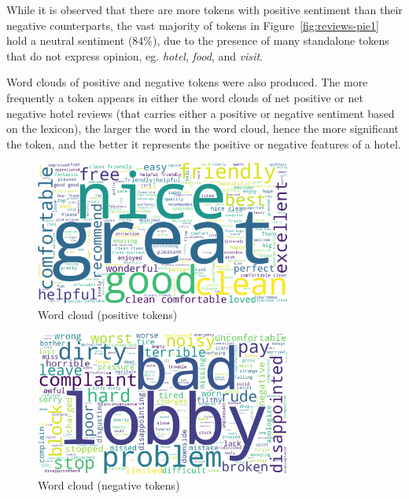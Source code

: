 \documentclass[12pt, bibliography=totocnumbered, paper=a4]{scrartcl}
\def\it#1{\textit{#1}}
\begin{document}
While it is observed that there are more tokens with positive sentiment than
their negative counterparts, the vast majority of tokens in
Figure~\ref{fig:reviews-pie1} hold a neutral sentiment ($84\%$),
due to the presence of many standalone tokens that do not express opinion,
eg. \it{hotel}, \it{food}, and \it{visit}.

Word clouds of positive and negative tokens were also produced.
The more frequently a token appears in either the word clouds of
net positive or net negative hotel reviews (that carries either a positive
or negative sentiment based on the lexicon), the larger the word in the word cloud,
hence the more significant the token, and the better it represents the positive
or negative features of a hotel.

\begin{figure}[htpb]
	\begin{center}
		\includegraphics[width=0.75\textwidth]{rq1/wordcloud_pos.png}
	\end{center}
	\caption{Word cloud (positive tokens)}
	\label{fig:wordcloud-pos}
\end{figure}

\begin{figure}[htpb]
	\begin{center}
		\includegraphics[width=0.75\textwidth]{rq1/wordcloud_neg.png}
	\end{center}
	\caption{Word cloud (negative tokens)}
	\label{fig:wordcloud-neg}
\end{figure}
\end{document}
